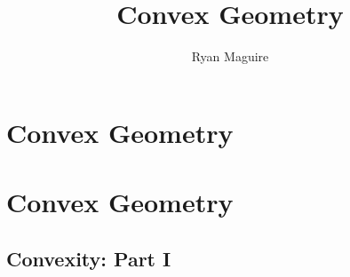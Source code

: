 \documentclass[crop=false,class=book,oneside]{standalone}
\begin{document}
    \ifx\ifmathcourses\undefined
        \title{Convex Geometry}
        \author{Ryan Maguire}
        \date{\vspace{-5ex}}
        \maketitle
        \tableofcontents
        \clearpage
        \chapter{Convex Geometry}
        \setcounter{chapter}{1}
    \else
        \chapter{Convex Geometry}
    \fi
    \section{Convexity: Part I}
\end{document}

